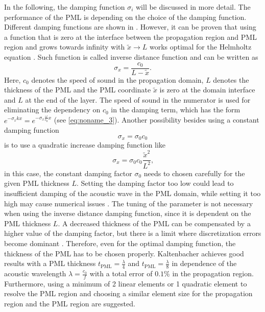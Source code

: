 In the following, the damping function $\sigma_i$ will be discussed in more detail. The performance of the PML is depending on the choice of the damping function. Different damping functions are shown in \cite{kaltenbacher_numerical_2007}. However, it can be proven that using a function that is zero at the interface between the propagation region and PML region and grows towards infinity with $\tilde{x}\rightarrow L$ works optimal for the Helmholtz equation \cite{kaltenbacher_numerical_2007,KALTENBACHER_PML_2013}. Such function is called inverse distance function and can be written as
\begin{equation}
	\sigma_x = \frac{c_0}{L - \tilde{x}}\text{.}
\end{equation}
Here, $c_0$ denotes the speed of sound in the propagation domain, $L$ denotes the thickness of the PML and the PML coordinate $\tilde{x}$ is zero at the domain interface and $L$ at the end of the layer. The speed of sound in the numerator is used for eliminating the dependency on $c_0$ in the damping term, which has the form $e^{-\sigma_x kx} = e^{-\sigma_x \frac{\omega}{c_0} x}$ (see \cref{eq:noname_3}). Another possibility besides using a constant damping function
\begin{equation}
	\sigma_x = \sigma_0c_0
\end{equation}
is to use a quadratic increase damping function like
\begin{equation}
	\sigma_x = \sigma_0c_0\frac{\tilde{x}^2}{L^2}\text{,}
\end{equation}
in this case, the constant damping factor $\sigma_0$ needs to chosen carefully for the given PML thickness $L$. Setting the damping factor too low could lead to insufficient damping of the acoustic wave in the PML domain, while setting it too high may cause numerical issues \cite{KALTENBACHER_PML_2013}. The tuning of the parameter is not necessary when using the inverse distance damping function, since it is dependent on the PML thickness $L$. A decreased thickness of the PML can be compensated by a higher value of the damping factor, but there is a limit where discretization errors become dominant \cite{KALTENBACHER_PML_2013}. Therefore, even for the optimal damping function, the thickness of the PML has to be chosen properly. Kaltenbacher \cite{KALTENBACHER_PML_2013} achieves good results with a PML thickness $t_\text{PML} = \frac{\lambda}{4}$ and $t_\text{PML} = \frac{\lambda}{8}$ in dependence of the acoustic wavelength $\lambda = \frac{c_0}{f}$ with a total error of $0.1\%$ in the propagation region. Furthermore, using a minimum of 2 linear elements or 1 quadratic element to resolve the PML region and choosing a similar element size for the propagation region and the PML region are suggested.

